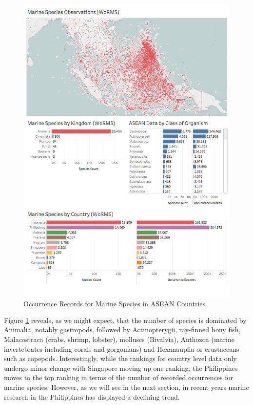 \documentclass[]{book}
\theoremstyle{definition}
\theoremstyle{definition}
\theoremstyle{definition}
\theoremstyle{remark}
\begin{document}
\begin{figure}

{\centering \includegraphics[width=1\linewidth]{images/asean_marine_biodiversity} 

}

\caption{Occurrence Records for Marine Species in ASEAN Countries}\label{fig:marine}
\end{figure}

Figure \ref{fig:marine} reveals, as we might expect, that the number of
species is dominated by Animalia, notably gastropods, followed by
Actinopterygii, ray-finned bony fish, Malacostraca (crabs, shrimp,
lobster), molluscs (Bivalvia), Anthozoa (marine invertebrates including
corals and gorgonians) and Hexanauplia or crustaceans such as copepods.
Interestingly, while the rankings for country level data only undergo
minor change with Singapore moving up one ranking, the Philippines moves
to the top ranking in terms of the number of recorded occurrences for
marine species. However, as we will see in the next section, in recent
years marine research in the Philippines has displayed a declining
trend.
\end{document}
